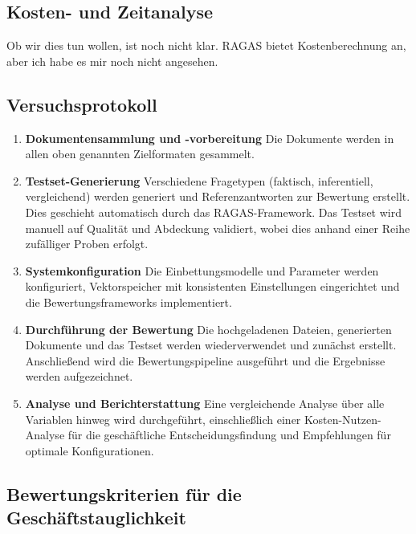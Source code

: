 \subsection{Kosten- und Zeitanalyse}
Ob wir dies tun wollen, ist noch nicht klar. RAGAS bietet Kostenberechnung an, aber ich habe es mir noch nicht angesehen.

\subsection{Versuchsprotokoll}

\begin{enumerate}
    \item \textbf{Dokumentensammlung und -vorbereitung}
    Die Dokumente werden in allen oben genannten Zielformaten gesammelt.
    
    \item \textbf{Testset-Generierung}
    Verschiedene Fragetypen (faktisch, inferentiell, vergleichend) werden generiert und Referenzantworten zur Bewertung erstellt.
    Dies geschieht automatisch durch das RAGAS-Framework.
    Das Testset wird manuell auf Qualität und Abdeckung validiert, wobei dies anhand einer Reihe zufälliger Proben erfolgt.
    
    \item \textbf{Systemkonfiguration}
    Die Einbettungsmodelle und Parameter werden konfiguriert, Vektorspeicher mit konsistenten Einstellungen eingerichtet und die Bewertungsframeworks implementiert.
    
    \item \textbf{Durchführung der Bewertung}
    Die hochgeladenen Dateien, generierten Dokumente und das Testset werden wiederverwendet und zunächst erstellt.
    Anschließend wird die Bewertungspipeline ausgeführt und die Ergebnisse werden aufgezeichnet.
    
    \item \textbf{Analyse und Berichterstattung}
    Eine vergleichende Analyse über alle Variablen hinweg wird durchgeführt, einschließlich einer Kosten-Nutzen-Analyse für die geschäftliche Entscheidungsfindung und Empfehlungen für optimale Konfigurationen.
\end{enumerate}

\subsection{Bewertungskriterien für die Geschäftstauglichkeit}

